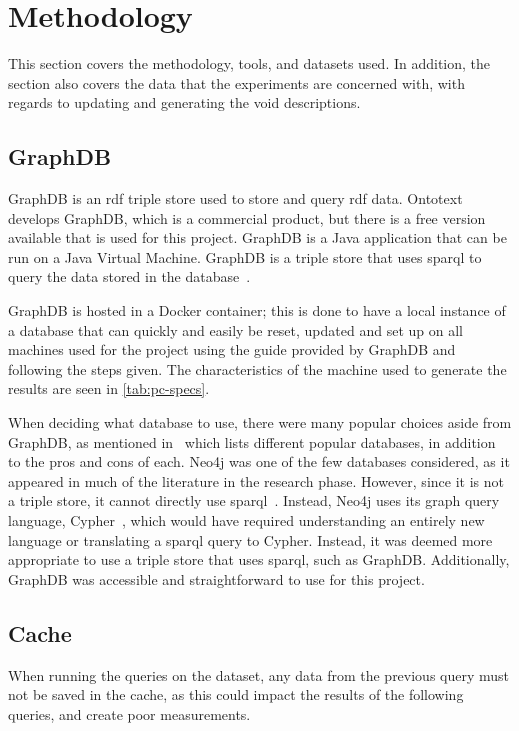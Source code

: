 \section{Methodology}\label{sec:methodology}
This section covers the methodology, tools, and datasets used. In addition, the section also covers the data that the experiments are concerned with, with regards to updating and generating the \gls{void} descriptions.

\subsection{GraphDB}\label{sec:graphdb}
GraphDB is an \gls{rdf} triple store used to store and query \gls{rdf} data. Ontotext develops GraphDB, which is a commercial product, but there is a free version available that is used for this project. GraphDB is a Java application that can be run on a Java Virtual Machine. GraphDB is a triple store that uses \gls{sparql} to query the data stored in the database~\cite{graphdb-product}.

GraphDB is hosted in a Docker container; this is done to have a local instance of a database that can quickly and easily be reset, updated and set up on all machines used for the project using the guide provided by GraphDB and following the steps given. The characteristics of the machine used to generate the results are seen in \autoref{tab:pc-specs}.

When deciding what database to use, there were many popular choices aside from GraphDB, as mentioned in~\cite{best-graph-databases} which lists different popular databases, in addition to the pros and cons of each. Neo4j was one of the few databases considered, as it appeared in much of the literature in the research phase. However, since it is not a triple store, it cannot directly use \gls{sparql}~\cite{neo4j:-a-reasonable-RDF-graph-database}. Instead, Neo4j uses its graph query language, Cypher~\cite{cypher-query-language}, which would have required understanding an entirely new language or translating a \gls{sparql} query to Cypher. Instead, it was deemed more appropriate to use a triple store that uses \gls{sparql}, such as GraphDB. Additionally, GraphDB was accessible and straightforward to use for this project.

\subsection{Cache}\label{sec:cache}
When running the queries on the dataset, any data from the previous query must not be saved in the cache, as this could impact the results of the following queries, and create poor measurements.

